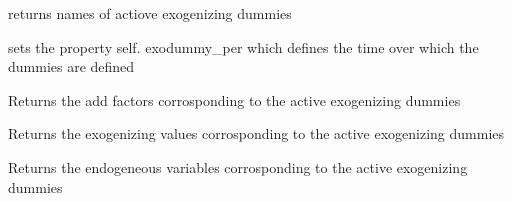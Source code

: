 \documentclass[letterpaper,10pt,english]{sphinxmanual}
\begin{document}
\begin{fulllineitems}
\begin{fulllineitems}
\end{fulllineitems}


\begin{fulllineitems}
\label{\detokenize{core/modelclass:modelclass.WB_Mixin.fix_dummy_fixed_old}}
\pysigstartsignatures
{}
\pysigstopsignatures
\sphinxAtStartPar
returns names of actiove exogenizing dummies

\sphinxAtStartPar
sets the property self. exodummy\_per which defines the time over which the dummies are defined

\end{fulllineitems}


\begin{fulllineitems}
\label{\detokenize{core/modelclass:modelclass.WB_Mixin.fix_add_factor_fixed}}
\pysigstartsignatures
{}
\pysigstopsignatures
\sphinxAtStartPar
Returns the add factors corrosponding to the active exogenizing dummies

\end{fulllineitems}


\begin{fulllineitems}
\label{\detokenize{core/modelclass:modelclass.WB_Mixin.fix_value_fixed}}
\pysigstartsignatures
{}
\pysigstopsignatures
\sphinxAtStartPar
Returns the exogenizing values corrosponding to the active exogenizing dummies

\end{fulllineitems}


\begin{fulllineitems}
\label{\detokenize{core/modelclass:modelclass.WB_Mixin.fix_endo_fixed}}
\pysigstartsignatures
{}
\pysigstopsignatures
\sphinxAtStartPar
Returns the endogeneous variables corrosponding to the active exogenizing dummies


\end{fulllineitems}
\end{fulllineitems}
\end{document}
